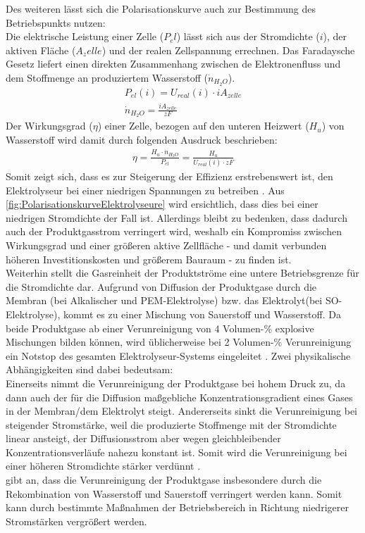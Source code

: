 Des weiteren lässt sich die Polarisationskurve auch zur Bestimmung des Betriebspunkts nutzen:\\
Die elektrische Leistung einer Zelle ($P_el$) lässt sich aus der Stromdichte ($i$), der aktiven Fläche ($A_zelle$) und der realen Zellspannung errechnen. Das Faradaysche Gesetz liefert einen direkten Zusammenhang zwischen de Elektronenfluss und dem Stoffmenge an produziertem Wasserstoff ($\dot{n}_{H_2O}$).
\begin{align}
	P_{el}(i) = U_{real}(i)\cdot i A_{zelle}\\
	\dot{n}_{H_2O} = \frac{i A_{zelle}}{zF}
\end{align}
Der Wirkungsgrad ($\eta$) einer Zelle, bezogen auf den unteren Heizwert ($H_u$) von Wasserstoff wird damit durch folgenden Ausdruck beschrieben:
\begin{align}
	\eta = \frac{H_u \cdot\dot{n}_{H_2O}}{P_{el}} = \frac{H_u}{U_{real}(i)\cdot{zF}}
\end{align}
Somit zeigt sich, dass es zur Steigerung der Effizienz erstrebenswert ist, den Elektrolyseur bei einer niedrigen Spannungen zu betreiben \citep{biaku_semiempirical_2008}. Aus \ref{fig:PolarisationskurveElektrolyseure} wird ersichtlich, dass dies bei einer niedrigen Stromdichte der Fall ist. Allerdings bleibt zu bedenken, dass dadurch auch der Produktgasstrom verringert wird, weshalb ein Kompromiss zwischen Wirkungsgrad und einer größeren aktive Zellfläche - und damit verbunden höheren Investitionskosten und größerem Bauraum - zu finden ist.\\
Weiterhin stellt die Gasreinheit der Produktströme eine untere Betriebsgrenze für die Stromdichte dar. Aufgrund von Diffusion der Produktgase durch die Membran (bei Alkalischer und PEM-Elektrolyse) bzw. das Elektrolyt(bei SO-Elektrolyse), kommt es zu einer Mischung von Sauerstoff und Wasserstoff. Da beide Produktgase ab einer Verunreinigung von $4$ Volumen-\% explosive Mischungen bilden können, wird üblicherweise bei 2 Volumen-\% Verunreinigung ein Notstop des gesamten Elektrolyseur-Systems eingeleitet \cite{brauns_alkaline_2020}. Zwei physikalische  Abhängigkeiten sind dabei bedeutsam:\\ 
Einerseits nimmt die Verunreinigung der Produktgase bei hohem Druck zu, da dann auch der für die Diffusion maßgebliche Konzentrationsgradient eines Gases in der Membran/dem Elektrolyt steigt.
Andererseits sinkt die Verunreinigung bei steigender Stromstärke, weil die produzierte Stoffmenge mit der Stromdichte linear ansteigt, der Diffusionsstrom aber wegen gleichbleibender Konzentrationsverläufe  nahezu konstant ist. Somit wird die Verunreinigung bei einer höheren Stromdichte stärker verdünnt \citep{brauns_alkaline_2020}.\\
\citet{grigoriev_high-pressure_2011} gibt an, dass die Verunreinigung der Produktgase insbesondere durch die Rekombination von Wasserstoff und Sauerstoff verringert werden kann.  Somit kann durch bestimmte Maßnahmen der Betriebsbereich in Richtung niedrigerer Stromstärken vergrößert werden.

